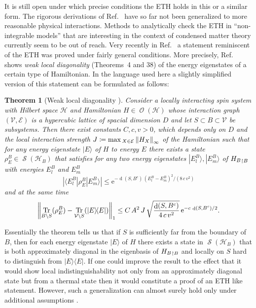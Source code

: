\documentclass[a4paper,12pt,listof=totoc,index=totoc,bibliography=totoc,headsepline=false,headings=normal,BCOR16.153846mm,DIV12,headinclude,twoside,cleardoublepage=empty,numbers=noenddot,final]{scrreprt}
\theoremstyle{mystyle}
\numberwithin{equation}{section}
\numberwithin{figure}{section}
\numberwithin{lemma}{section}
\newtheorem{theorem}{Theorem}
\numberwithin{theorem}{section}
\numberwithin{corollary}{section}
\numberwithin{definition}{section}
\numberwithin{conjecture}{section}
\numberwithin{observation}{section}
\newcommand{\+}{\mkern2mu}
\newcommand{\coloneqq}{\mathrel{\vcentcolon\mkern-1.2mu=}} %
\renewcommand{\max}{\mathchoice{\operatorname*{max}}{\operatorname*{max}}{\mathrm{max}}{\mathrm{max}}} %
\renewcommand{\H}{H}
\newcommand{\Vset}{\mathcal{V}}
\newcommand{\Eset}{\mathcal{E}}
\newcommand{\bra}[1]{\langle #1|}
\newcommand{\ket}[1]{|#1\rangle}
\newcommand{\ketbra}[2]{\ket{#1}\!\bra{#2}}
\newcommand{\norm}[2][]{
  \ifthenelse{\equal{#1}{}}
    {\left\| {#2} \right\|}
    {\ifthenelse{\equal{#1}{uinv}}
      {\left\vert\kern-0.25ex\left\vert\kern-0.25ex\left\vert {#2} \right\vert\kern-0.25ex\right\vert\kern-0.25ex\right\vert}
      {\left\| {#2} \right\|_{#1}}
    }
}
\newcommand{\compl}[1]{{{#1}^c}}
\newcommand{\trunc}[2]{{#1}_{\upharpoonright \mathnormal{#2}}}
\newcommand{\e}{\mathrm{e}}
\DeclareMathOperator{\1}{\mathds{1}}
\DeclareMathOperator{\Obs}{\mathcal{O}}
\DeclareMathOperator{\Qst}{\mathcal{S}}
\DeclareMathOperator{\Tr}{Tr}
\DeclareMathOperator{\dist}{d}
\newcommand{\mc}[1]{\mathcal{#1}}
\newcommand{\mcH}{\mc{H}}
\begin{document}
It is still open under which precise conditions the ETH holds in this or a similar form.
The rigorous derivations of Ref.~\cite{tasaki98} have so far not been generalized to more reasonable physical interactions.
Methods to analytically check the ETH in ``non-integrable models'' that are interesting in the context of condensed matter theory currently seem to be out of reach.
Very recently in Ref.~\cite{Mueller2013} a statement reminiscent of the ETH was proved under fairly general conditions.
More precisely, Ref.~\cite{Mueller2013} shows \emph{weak local diagonality} (Theorems~4 and 38) of the energy eigenstates of a certain type of Hamiltonian.
In the language used here a slightly simplified version of this statement can be formulated as follows:
\begin{theorem}[Weak local diagonality \cite{Mueller2013}]
  Consider a locally interacting spin system with Hilbert space $\mcH$ and Hamiltonian $\H \in \Obs(\mcH)$ whose interaction graph $(\Vset,\Eset)$ is a hypercubic lattice of spacial dimension $D$ and let $S \subset B \subset \Vset$ be subsystems.
  Then there exist constants $C,c,v > 0$, which depends only on $D$ and the local interaction strength $J \coloneqq \max_{X\in\Eset} \norm[\infty]{\H_X}$ of the Hamiltonian such that for any energy eigenstate $\ket E$ of $\H$ to energy $E$ there exists a state $\rho^B_E \in \Qst(\mcH_B)$ that satisfies for any two energy eigenstates $\ket{E^B_l}, \ket{E^B_m}$ of $\trunc {\H_B} B$ with energies $E^B_l$ and $E^B_m$
  \begin{equation}
    |\bra{E^B_l} \rho^B_E \ket{E^B_m}| \leq \e^{-\dist(S,\compl B)\,(E^B_l-E^B_m)^2/(8\,c\,v^2)}
  \end{equation}
  and at the same time
  \begin{equation}
    \norm[1]{\Tr_{B \setminus S}(\rho^B_E) - \Tr_{\Vset \setminus S}(\ketbra{E}{E}) } \leq C\,A^2\,J\,\sqrt{\frac{\dist(S,\compl B)}{4\,c\,v^2}}\,\e^{-c\,\dist(S,\compl B)/2} .
  \end{equation}
\end{theorem}
Essentially the theorem tells us that if $S$ is sufficiently far from the boundary of $B$, then for each energy eigenstate $\ket{E}$ of $\H$ there exists a state in $\Qst(\mcH_B)$ that is both approximately diagonal in the eigenbasis of $\trunc {\H_B} B$ and locally on $S$ hard to distinguish from $\ketbra{E}{E}$.
If one could improve the result to the effect that it would show local indistinguishability not only from an approximately diagonal state but from a thermal state then it would constitute a proof of an ETH like statement.
However, such a generalization can almost surely hold only under additional assumptions \cite{Mueller2013}.
\end{document}
